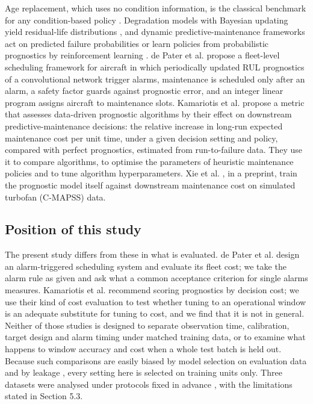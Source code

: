 \documentclass[a4paper,fleqn,doubleblind]{cas-dc}
\begin{document}
Age replacement, which uses no condition information, is the classical benchmark for any condition-based policy \cite{barlow1960,dejonge2020}. Degradation models with Bayesian updating yield residual-life distributions \cite{gebraeel2005}, and dynamic predictive-maintenance frameworks act on predicted failure probabilities \cite{nguyen2019,mitici2023} or learn policies from probabilistic prognostics by reinforcement learning \cite{lee2023}. de Pater et al. \cite{depater2022} propose a fleet-level scheduling framework for aircraft in which periodically updated RUL prognostics of a convolutional network trigger alarms, maintenance is scheduled only after an alarm, a safety factor guards against prognostic error, and an integer linear program assigns aircraft to maintenance slots. Kamariotis et al. \cite{kamariotis2024} propose a metric that assesses data-driven prognostic algorithms by their effect on downstream predictive-maintenance decisions: the relative increase in long-run expected maintenance cost per unit time, under a given decision setting and policy, compared with perfect prognostics, estimated from run-to-failure data. They use it to compare algorithms, to optimise the parameters of heuristic maintenance policies and to tune algorithm hyperparameters. Xie et al. \cite{xie2025}, in a preprint, train the prognostic model itself against downstream maintenance cost on simulated turbofan (C-MAPSS) data.

\subsection{Position of this study}

The present study differs from these in what is evaluated. de Pater et al. \cite{depater2022} design an alarm-triggered scheduling system and evaluate its fleet cost; we take the alarm rule as given and ask what a common acceptance criterion for single alarms measures. Kamariotis et al. \cite{kamariotis2024} recommend scoring prognostics by decision cost; we use their kind of cost evaluation to test whether tuning to an operational window is an adequate substitute for tuning to cost, and we find that it is not in general. Neither of those studies is designed to separate observation time, calibration, target design and alarm timing under matched training data, or to examine what happens to window accuracy and cost when a whole test batch is held out. Because such comparisons are easily biased by model selection on evaluation data \cite{varma2006} and by leakage \cite{kapoor2023}, every setting here is selected on training units only. Three datasets were analysed under protocols fixed in advance \cite{nosek2018}, with the limitations stated in Section 5.3.
\end{document}
